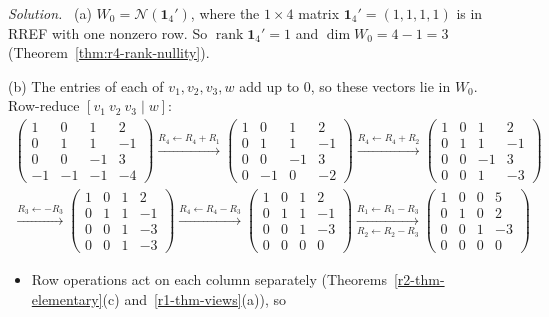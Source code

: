 \documentclass[12pt]{article}
\newcommand{\one}{\mathbf 1}
\DeclareMathOperator{\rank}{rank}
\theoremstyle{definition}
\newenvironment{solution}{\par\noindent\textit{Solution.}\ }{\par\smallskip}
\begin{document}
\begin{solution}
(a) \(W_0=\mathcal N(\one_4')\), where the \(1\times4\) matrix \(\one_4'=(1,1,1,1)\) is in RREF with one nonzero row. So
\(\rank\one_4'=1\) and \(\dim W_0=4-1=3\) (Theorem~\ref{thm:r4-rank-nullity}).

(b) The entries of each of \(v_1,v_2,v_3,w\) add up to \(0\), so these vectors lie in \(W_0\). Row-reduce
\([v_1\ v_2\ v_3\mid w]\):
\[
\begin{gathered}
\left(\begin{array}{ccc|c}1&0&1&2\\0&1&1&-1\\0&0&-1&3\\-1&-1&-1&-4\end{array}\right)
\xrightarrow{R_4\leftarrow R_4+R_1}
\left(\begin{array}{ccc|c}1&0&1&2\\0&1&1&-1\\0&0&-1&3\\0&-1&0&-2\end{array}\right)
\xrightarrow{R_4\leftarrow R_4+R_2}
\left(\begin{array}{ccc|c}1&0&1&2\\0&1&1&-1\\0&0&-1&3\\0&0&1&-3\end{array}\right)
\\
\xrightarrow{R_3\leftarrow-R_3}
\left(\begin{array}{ccc|c}1&0&1&2\\0&1&1&-1\\0&0&1&-3\\0&0&1&-3\end{array}\right)
\xrightarrow{R_4\leftarrow R_4-R_3}
\left(\begin{array}{ccc|c}1&0&1&2\\0&1&1&-1\\0&0&1&-3\\0&0&0&0\end{array}\right)
\xrightarrow[R_2\leftarrow R_2-R_3]{R_1\leftarrow R_1-R_3}
\left(\begin{array}{ccc|c}1&0&0&5\\0&1&0&2\\0&0&1&-3\\0&0&0&0\end{array}\right)
\end{gathered}
\]
\begin{itemize}
\item Row operations act on each column separately (Theorems~\ref{r2-thm-elementary}(c) and~\ref{r1-thm-views}(a)), so

\end{itemize}
\end{solution}
\end{document}
